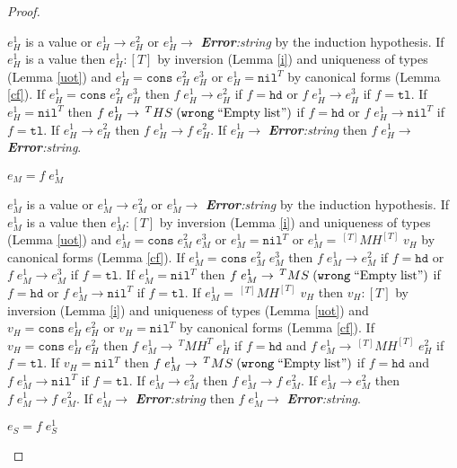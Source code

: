 \begin{theorem}
\begin{proof}
\begin{case}
$e_{H}^{1}$ is a value or $e_{H}^{1}\rightarrow e_{H}^{2}$ or $e_{H}^{1}\rightarrow$ \emph{\textbf{Error}:\;string} by the induction hypothesis.  If $e_{H}^{1}$ is a value then $e_{H}^{1}:[T]$ by inversion (Lemma \ref{i}) and uniqueness of types (Lemma \ref{uot}) and $e_{H}^{1}=\mathtt{cons}\;e_{H}^{2}\;e_{H}^{3}$ or $e_{H}^{1}=\mathtt{nil}^{T}$ by canonical forms (Lemma \ref{cf}).  If $e_{H}^{1}=\mathtt{cons}\;e_{H}^{2}\;e_{H}^{3}$ then $f\;e_{H}^{1}\rightarrow e_{H}^{2}$ if $f=\mathtt{hd}$ or $f\;e_{H}^{1}\rightarrow e_{H}^{3}$ if $f=\mathtt{tl}$.  If $e_{H}^{1}=\mathtt{nil}^{T}$ then $f\;e_{H}^{1}\rightarrow\,^{T}HS\;(\mathtt{wrong}\;\mathrm{``Empty\;list"})$ if $f=\mathtt{hd}$ or $f\;e_{H}^{1}\rightarrow\mathtt{nil}^{T}$ if $f=\mathtt{tl}$.  If $e_{H}^{1}\rightarrow e_{H}^{2}$ then $f\;e_{H}^{1}\rightarrow f\;e_{H}^{2}$.  If $e_{H}^{1}\rightarrow$ \emph{\textbf{Error}:\;string} then $f\;e_{H}^{1}\rightarrow$ \emph{\textbf{Error}:\;string}.
\end{case}
\begin{case}
$e_{M}=f\;e_{M}^{1}$

$e_{M}^{1}$ is a value or $e_{M}^{1}\rightarrow e_{M}^{2}$ or $e_{M}^{1}\rightarrow$ \emph{\textbf{Error}:\;string} by the induction hypothesis.  If $e_{M}^{1}$ is a value then $e_{M}^{1}:[T]$ by inversion (Lemma \ref{i}) and uniqueness of types (Lemma \ref{uot}) and $e_{M}^{1}=\mathtt{cons}\;e_{M}^{2}\;e_{M}^{3}$ or $e_{M}^{1}=\mathtt{nil}^{T}$ or $e_{M}^{1}=\,^{[T]}MH^{[T]}\;v_{H}$ by canonical forms (Lemma \ref{cf}).  If $e_{M}^{1}=\mathtt{cons}\;e_{M}^{2}\;e_{M}^{3}$ then $f\;e_{M}^{1}\rightarrow e_{M}^{2}$ if $f=\mathtt{hd}$ or $f\;e_{M}^{1}\rightarrow e_{M}^{3}$ if $f=\mathtt{tl}$.  If $e_{M}^{1}=\mathtt{nil}^{T}$ then $f\;e_{M}^{1}\rightarrow\,^{T}MS\;(\mathtt{wrong}\;\mathrm{``Empty\;list"})$ if $f=\mathtt{hd}$ or $f\;e_{M}^{1}\rightarrow\mathtt{nil}^{T}$ if $f=\mathtt{tl}$.  If $e_{M}^{1}=\,^{[T]}MH^{[T]}\;v_{H}$ then $v_{H}:[T]$ by inversion (Lemma \ref{i}) and uniqueness of types (Lemma \ref{uot}) and $v_{H}=\mathtt{cons}\;e_{H}^{1}\;e_{H}^{2}$ or $v_{H}=\mathtt{nil}^{T}$ by canonical forms (Lemma \ref{cf}).  If $v_{H}=\mathtt{cons}\;e_{H}^{1}\;e_{H}^{2}$ then $f\;e_{M}^{1}\rightarrow\,^{T}MH^{T}\;e_{H}^{1}$ if $f=\mathtt{hd}$ and $f\;e_{M}^{1}\rightarrow\,^{[T]}MH^{[T]}\;e_{H}^{2}$ if $f=\mathtt{tl}$.  If $v_{H}=\mathtt{nil}^{T}$ then $f\;e_{M}^{1}\rightarrow\,^{T}MS\;(\mathtt{wrong}\;\mathrm{``Empty\;list"})$ if $f=\mathtt{hd}$ and $f\;e_{M}^{1}\rightarrow\mathtt{nil}^{T}$ if $f=\mathtt{tl}$.  If $e_{M}^{1}\rightarrow e_{M}^{2}$ then $f\;e_{M}^{1}\rightarrow f\;e_{M}^{2}$.  If $e_{M}^{1}\rightarrow e_{M}^{2}$ then $f\;e_{M}^{1}\rightarrow f\;e_{M}^{2}$.  If $e_{M}^{1}\rightarrow$ \emph{\textbf{Error}:\;string} then $f\;e_{M}^{1}\rightarrow$ \emph{\textbf{Error}:\;string}.
\end{case}
\begin{case}
$e_{S}=f\;e_{S}^{1}$


\end{case}
\end{proof}
\end{theorem}
